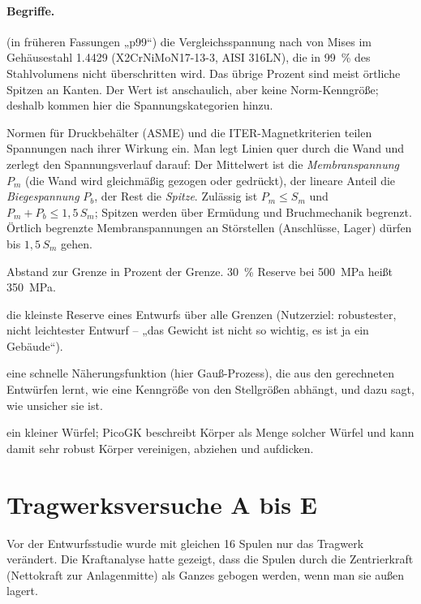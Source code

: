 \documentclass[10pt,a4paper]{article}
\begin{document}
\paragraph{Begriffe.}
\begin{description}\itemsep2pt
\item[99-\%-Spannung $\sigma_{99}$] (in früheren Fassungen „p99“) die Vergleichsspannung nach von Mises im Gehäusestahl 1.4429
(X2CrNiMoN17-13-3, AISI 316LN), die in 99~\% des Stahlvolumens nicht überschritten wird. Das übrige Prozent sind meist örtliche Spitzen an Kanten. Der
Wert ist anschaulich, aber keine Norm-Kenngröße; deshalb kommen hier die Spannungskategorien hinzu.
\item[Spannungskategorien] Normen für Druckbehälter (ASME) und die ITER-Magnetkriterien teilen Spannungen nach ihrer
Wirkung ein. Man legt Linien quer durch die Wand und zerlegt den Spannungsverlauf darauf: Der Mittelwert ist die
\emph{Membranspannung} $P_m$ (die Wand wird gleichmäßig gezogen oder gedrückt), der lineare Anteil die
\emph{Biegespannung} $P_b$, der Rest die \emph{Spitze}. Zulässig ist $P_m\le S_m$ und $P_m+P_b\le1{,}5\,S_m$;
Spitzen werden über Ermüdung und Bruchmechanik begrenzt. Örtlich begrenzte Membranspannungen an Störstellen
(Anschlüsse, Lager) dürfen bis $1{,}5\,S_m$ gehen.
\item[Reserve] Abstand zur Grenze in Prozent der Grenze. 30~\% Reserve bei \SI{500}{MPa} heißt \SI{350}{MPa}.
\item[Robustheit] die kleinste Reserve eines Entwurfs über alle Grenzen (Nutzerziel: robustester, nicht leichtester
Entwurf -- „das Gewicht ist nicht so wichtig, es ist ja ein Gebäude“).
\item[Ersatzmodell] eine schnelle Näherungsfunktion (hier Gauß-Prozess), die aus den gerechneten Entwürfen lernt,
wie eine Kenngröße von den Stellgrößen abhängt, und dazu sagt, wie unsicher sie ist.
\item[Voxel] ein kleiner Würfel; PicoGK beschreibt Körper als Menge solcher Würfel und kann damit sehr robust
Körper vereinigen, abziehen und aufdicken.
\end{description}

\section{Tragwerksversuche A bis E}\label{sec:tragwerk}
Vor der Entwurfsstudie wurde mit gleichen 16 Spulen nur das Tragwerk verändert. Die Kraftanalyse hatte gezeigt, dass
die Spulen durch die Zentrierkraft (Nettokraft zur Anlagenmitte) als Ganzes gebogen werden, wenn man sie außen lagert.
\end{document}
